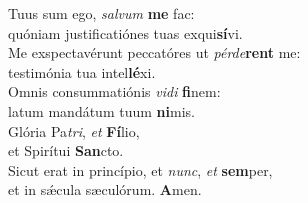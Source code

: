 \evenverse Tuus sum ego, \textit{sal}\textit{vum} \textbf{me} fac:~\*\\
\evenverse quóniam justificatiónes tuas exqui\textbf{sí}vi.\\
\oddverse Me exspectavérunt peccatóres ut \textit{pér}\textit{de}\textbf{rent} me:~\*\\
\oddverse testimónia tua intel\textbf{lé}xi.\\
\evenverse Omnis consummatiónis \textit{vi}\textit{di} \textbf{fi}nem:~\*\\
\evenverse latum mandátum tuum \textbf{ni}mis.\\
\oddverse Glória Pa\textit{tri}, \textit{et} \textbf{Fí}lio,~\*\\
\oddverse et Spirítui \textbf{San}cto.\\
\evenverse Sicut erat in princípio, et \textit{nunc}, \textit{et} \textbf{sem}per,~\*\\
\evenverse et in sǽcula sæculórum. \textbf{A}men.\\

